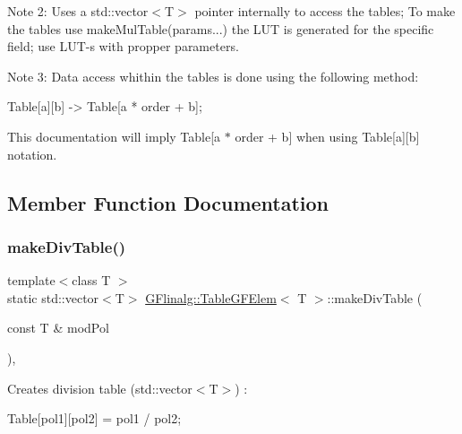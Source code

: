 Note 2\+: Uses a std\+::vector$<$\+T$>$ pointer internally to access the tables; To make the tables use make\+Mul\+Table(params...) the L\+UT is generated for the specific field; use L\+U\+T-\/s with propper parameters.

Note 3\+: Data access whithin the tables is done using the following method\+: \begin{DoxyVerb}Table[a][b] -> Table[a * order +  b];
\end{DoxyVerb}


This documentation will imply Table\mbox{[}a $\ast$ order + b\mbox{]} when using Table\mbox{[}a\mbox{]}\mbox{[}b\mbox{]} notation. 

\subsection{Member Function Documentation}
\mbox{\label{class_g_flinalg_1_1_table_g_f_elem_ac7651502d27e64293acbe7b30841c10d}} 
\subsubsection{\texorpdfstring{makeDivTable()}{makeDivTable()}}
{\footnotesize\ttfamily template$<$class T $>$ \\
static std\+::vector$<$T$>$ \mbox{\hyperlink{class_g_flinalg_1_1_table_g_f_elem}{G\+Flinalg\+::\+Table\+G\+F\+Elem}}$<$ T $>$\+::make\+Div\+Table (\begin{DoxyParamCaption}\item[{const T \&}]{mod\+Pol }\end{DoxyParamCaption})\hspace{0.3cm}{\ttfamily [inline]}, {\ttfamily [static]}}

Creates division table (std\+::vector$<$\+T$>$) \+: \begin{DoxyVerb}Table[pol1][pol2] = pol1 / pol2;
\end{DoxyVerb}
 \mbox{\label{class_g_flinalg_1_1_table_g_f_elem_ab8316e926ccc41e83ff3c8aab82438ee}} 
